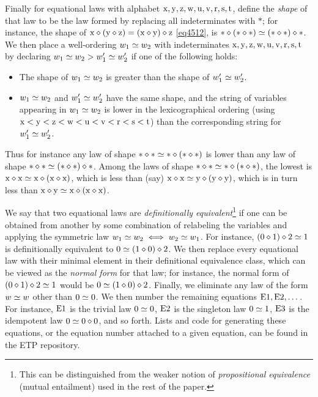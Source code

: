 Finally for equational laws with alphabet $\mathrm{x},\mathrm{y},\mathrm{z},\mathrm{w},\mathrm{u},\mathrm{v},\mathrm{r},\mathrm{s},\mathrm{t}$, define the \emph{shape} of that law to be the law formed by replacing all indeterminates with $\ast$; for instance, the shape of $\mathrm{x} \diamond (\mathrm{y} \diamond \mathrm{z}) = (\mathrm{x} \diamond \mathrm{y}) \diamond \mathrm{z}$ \eqref{eq4512}, is $\ast \diamond (\ast \diamond \ast) \simeq (\ast \diamond \ast) \diamond \ast$.  We then place a well-ordering $w_1 \simeq w_2$ with indeterminates $\mathrm{x},\mathrm{y},\mathrm{z},\mathrm{w},\mathrm{u},\mathrm{v},\mathrm{r},\mathrm{s},\mathrm{t}$ by declaring $w_1 \simeq w_2 > w'_1 \simeq w'_2$ if one of the following holds:
\begin{itemize}
\item The shape of $w_1 \simeq w_2$ is greater than the shape of $w'_1 \simeq w'_2$.
\item $w_1 \simeq w_2$ and $w'_1 \simeq w'_2$ have the same shape, and the string of variables appearing in $w_1 \simeq w_2$ is lower in the lexicographical ordering (using $\mathrm{x} < \mathrm{y} < \mathrm{z} < \mathrm{w} < \mathrm{u} < \mathrm{v} < \mathrm{r} < \mathrm{s} < \mathrm{t}$) than the corresponding string for $w'_1 \simeq w'_2$.
\end{itemize}
Thus for instance any law of shape $\ast \diamond \ast \simeq \ast \diamond (\ast \diamond \ast)$ is lower than any law of shape
$\ast \diamond \ast \simeq (\ast \diamond \ast) \diamond \ast$.  Among the laws of shape $\ast \diamond \ast \simeq \ast \diamond (\ast \diamond \ast)$, the lowest is $\mathrm{x} \diamond \mathrm{x} \simeq \mathrm{x} \diamond (\mathrm{x} \diamond \mathrm{x})$, which is less than (say) $\mathrm{x} \diamond \mathrm{x} \simeq \mathrm{y} \diamond (\mathrm{y} \diamond \mathrm{y})$, which is in turn less than $\mathrm{x} \diamond \mathrm{y} \simeq \mathrm{x} \diamond (\mathrm{x} \diamond \mathrm{x})$.

We say that two equational laws are \emph{definitionally equivalent}\footnote{This can be distinguished from the weaker notion of \emph{propositional equivalence} (mutual entailment) used in the rest of the paper.} if one can be obtained from another by some combination of relabeling the variables and applying the symmetric law $w_1 \simeq w_2 \iff w_2 \simeq w_1$.  For instance, $(0 \diamond 1) \diamond 2 \simeq 1$ is definitionally equivalent to $0 \simeq (1 \diamond 0) \diamond 2$.  We then replace every equational law with their minimal element in their definitional equivalence class, which can be viewed as the \emph{normal form} for that law; for instance, the normal form of $(0 \diamond 1) \diamond 2 \simeq 1$ would be $0 \simeq (1 \diamond 0) \diamond 2$.  Finally, we eliminate any law of the form $w \simeq w$ other than $0 \simeq 0$.  We then number the remaining equations $\mathrm{E}1, \mathrm{E}2, \dots$.  For instance, $\mathrm{E}1$ is the trivial law $0 \simeq 0$, $\mathrm{E}2$ is the singleton law $0 \simeq 1$, $\mathrm{E}3$ is the idempotent law $0 \simeq 0 \diamond 0$, and so forth.  Lists and code for generating these equations, or the equation number attached to a given equation, can be found in the ETP repository.

